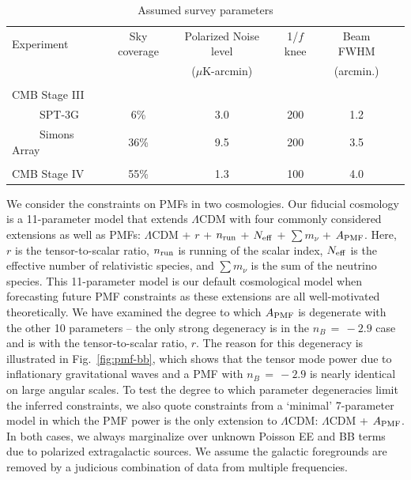 \documentclass[apj]{emulateapj}
\newcommand{\apmf}{\ensuremath{A_{\rm PMF}}}
\newcommand{\lcdm}{\ensuremath{\Lambda}CDM}
\newcommand{\nrun}{\ensuremath{n_{\rm run}}}
\newcommand{\neff}{\ensuremath{N_{\rm eff}}}
\newcommand{\mnu}{\ensuremath{\sum m_\nu}}
\begin{document}
\begin{table}[tbh]
\begin{center}
\caption{\label{tab:experiments} Assumed survey parameters}
\small
\begin{tabular}{l || c c c c c }
Experiment & Sky coverage & Polarized Noise level  & 1/$f$ knee & Beam FWHM \\
& &($\mu$K-arcmin)&&(arcmin.)\\
\hline
\tiny \\ \small
CMB Stage III & & & & \\
~~~~~SPT-3G & 6\% & 3.0 & 200 & 1.2 \\
~~~~~Simons Array & 36\% & 9.5 & 200 & 3.5 \\ 
\tiny \\ \small
CMB Stage IV & 55\% & 1.3 & 100 & 4.0 \\
\end{tabular}
 \normalsize
\end{center}
\end{table}





We consider the constraints on PMFs in two cosmologies. 
Our fiducial cosmology is a 11-parameter model that extends \lcdm{} with  four  commonly considered extensions as well as PMFs:  \lcdm{} +  $r$ + \nrun{} +  \neff{} + \mnu{} + \apmf. 
Here, $r$ is the tensor-to-scalar ratio, \nrun{} is running of the scalar index, \neff{} is the effective number of relativistic species, and \mnu{} is the sum of the neutrino species. 
This 11-parameter model is our default cosmological model when forecasting future PMF constraints as these extensions are all well-motivated theoretically. 
We have examined the degree to which \apmf{} is degenerate with the other 10 parameters -- the only strong degeneracy is in the $n_B\,=\,-2.9$ case and is with the tensor-to-scalar ratio, $r$. 
The reason for this degeneracy is illustrated in Fig.~\ref{fig:pmf-bb}, which shows that the tensor mode power due to inflationary gravitational waves and a PMF with $n_B\,=\,-2.9$ is nearly identical on large angular scales. 
To test the degree to which parameter degeneracies limit the inferred constraints,  we also quote constraints from a `minimal' 7-parameter model in which the PMF power is the only extension to \lcdm{}:  \lcdm{} + \apmf.
In both cases, we always marginalize over unknown Poisson EE and BB  terms due to polarized extragalactic sources. 
We assume the galactic foregrounds are removed by a judicious combination of data from multiple frequencies. 
\end{document}
